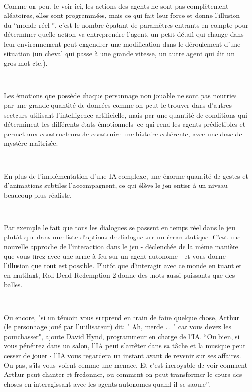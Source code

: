 ~\par
Comme on peut le voir ici, les actions des agents ne sont pas complètement aléatoires, elles sont programmées, mais ce qui fait leur force et donne l’illusion du “monde réel ”, c’est le nombre épatant de paramètres entrants en compte pour déterminer quelle action va entreprendre l’agent, un petit détail qui change dans leur environnement peut engendrer une modification dans le déroulement d’une situation (un cheval qui passe à une grande vitesse, un autre agent qui dit un gros mot etc.). 

~\par
Les émotions que possède chaque personnage non jouable ne sont pas nourries par une grande quantité de données comme on peut le trouver dans d’autres secteurs utilisant l’intelligence artificielle,  mais par une quantité de conditions qui déterminent les différents états émotionnels, ce qui rend les agents prédictibles et permet aux constructeurs de construire une histoire cohérente, avec une dose de mystère maîtrisée.

~\par
En plus de l’implémentation d’une IA complexe, une énorme quantité de gestes et d’animations subtiles l’accompagnent, ce qui élève le jeu entier à un niveau beaucoup plus réaliste.

~\par
Par exemple le fait que tous les dialogues se passent en temps réel dans le jeu plutôt que dans une liste d'options de dialogue sur un écran statique. C’est une nouvelle approche de l’interaction dans le jeu - déclenchée de la même manière que vous tirez avec une arme à feu sur un agent autonome - et vous donne l’illusion que tout est possible. Plutôt que d'interagir avec ce monde en tuant et en mutilant, Red Dead Redemption 2 donne des mots aussi puissants que des balles. 

~\par
Ou encore,  "si un témoin vous surprend en train de faire quelque chose, Arthur (le personnage joué par l’utilisateur) dit: " Ah, merde ... " car vous devez les pourchasser", ajoute David Hynd, programmeur en charge de l'IA. “Ou bien, si vous pénétrez dans un salon, l'IA peut s'arrêter dans sa tâche et la musique peut cesser de jouer - l'IA vous regardera un instant avant de revenir sur ses affaires. Ou pas, s'ils vous voient comme une menace. Et c’est incroyable de voir comment Arthur peut chanter et fredonner, ou comment on peut  transformer le cours des choses en interagissant avec les agents autonomes quand il se saoule”.

